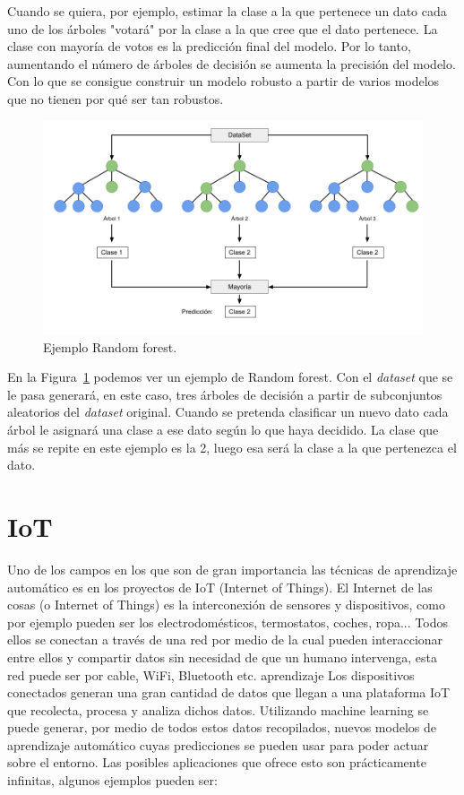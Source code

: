 \documentclass[a4paper, 12pt]{book}
\begin{document}
Cuando se quiera, por ejemplo, estimar la clase a la que pertenece un dato cada uno de los árboles "votará" por la clase a la que cree que el dato pertenece. La clase con mayoría de votos es la predicción final del modelo. Por lo tanto, aumentando el número de árboles de decisión se aumenta la precisión del modelo. Con lo que se consigue construir un modelo robusto a partir de varios modelos que no tienen por qué ser tan robustos.

\begin{figure}[]
  \centering
  \includegraphics[width=14cm, keepaspectratio]{img/ejemplo_randomForest.png}
  \caption{Ejemplo Random forest.}\label{fig:ejemplo_rforest}
\end{figure}

En la Figura~\ref{fig:ejemplo_rforest} podemos ver un ejemplo de Random forest. Con el \textit{dataset} que se le pasa generará, en este caso, tres árboles de decisión a partir de subconjuntos aleatorios del \textit{dataset} original. Cuando se pretenda clasificar un nuevo dato cada árbol le asignará una clase a ese dato según lo que haya decidido. La clase que más se repite en este ejemplo es la 2, luego esa será la clase a la que pertenezca el dato.

\section{IoT}
\label{sec:IoT}

Uno de los campos en los que son de gran importancia las técnicas de aprendizaje automático es en los proyectos de IoT (Internet of Things). El Internet de las cosas (o Internet of Things) es la interconexión de sensores y dispositivos, como por ejemplo pueden ser los electrodomésticos, termostatos, coches, ropa... Todos ellos se conectan a través de una red por medio de la cual pueden interaccionar entre ellos y compartir datos sin necesidad de que un humano intervenga, esta red puede ser por cable, WiFi, Bluetooth etc. 
aprendizaje
Los dispositivos conectados generan una gran cantidad de datos que llegan a una plataforma IoT que recolecta, procesa y analiza dichos datos. Utilizando machine learning se puede generar, por medio de todos estos datos recopilados, nuevos modelos de aprendizaje automático cuyas predicciones se pueden usar para poder actuar sobre el entorno. Las posibles aplicaciones que ofrece esto son prácticamente infinitas, algunos ejemplos pueden ser:
\end{document}
